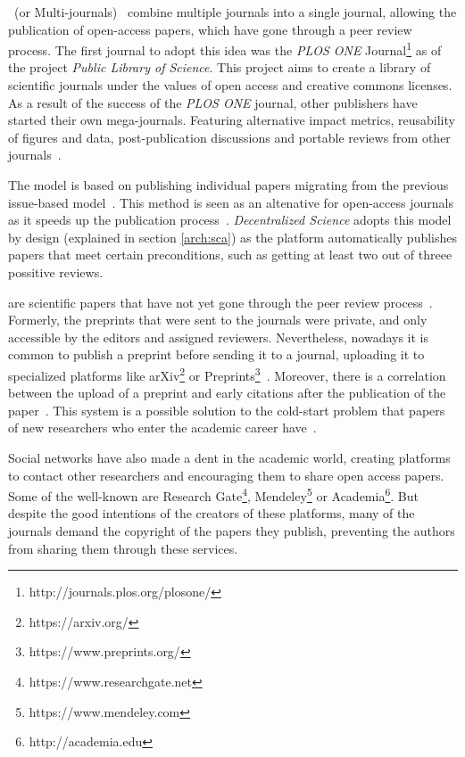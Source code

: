 ~(or Multi-journals)~\cite{binfield2013open,wellen2013open}
combine multiple journals into a single journal, allowing the publication of
open-access papers, which have gone through a peer review process. The first
journal to adopt this idea was the \emph{PLOS ONE}
Journal\footnote{http://journals.plos.org/plosone/} as of the project
\emph{Public Library of Science}. This project aims to create a library of
scientific journals under the values of open access and creative commons
licenses. As a result of the success of the \emph{PLOS ONE} journal, other
publishers have started their own mega-journals. Featuring alternative impact
metrics, reusability of figures and data, post-publication discussions and
portable reviews from other journals~\cite{bjork2015have}.

The  model is based on publishing individual papers
migrating from the previous issue-based model~\cite{anderton2013continuous}.
This method is seen as an altenative for open-access journals as it speeds up
the publication process~\cite{haymanview}. \emph{Decentralized Science} adopts
this model by design (explained in section \ref{arch:sca}) as the platform
automatically publishes papers that meet certain preconditions, such as getting
at least two out of threee possitive reviews.

 are scientific papers that have not yet gone through the peer
review process~\cite{harnad2003electronic}. Formerly, the preprints that were
sent to the journals were private, and only accessible by the editors and
assigned reviewers. Nevertheless, nowadays it is common to publish a preprint
before sending it to a journal, uploading it to specialized platforms like
arXiv\footnote{https://arxiv.org/} or
Preprints\footnote{https://www.preprints.org/}~\cite{brown2001volution}.
Moreover, there is a correlation between the upload of a preprint and early
citations after the publication of the paper~\cite{shuai2012scientific}. This
system is a possible solution to the cold-start problem that papers of new
researchers who enter the academic career have~\cite{sugiyama2010scholarly}.

Social networks have also made a dent in the academic world, creating platforms
to contact other researchers and encouraging them to share open access papers.
 Some of the well-known are Research
Gate\footnote{https://www.researchgate.net},
Mendeley\footnote{https://www.mendeley.com} or
Academia\footnote{http://academia.edu}. But despite the good intentions of the
creators of these platforms, many of the journals demand the copyright of the
papers they publish, preventing the authors from sharing them through these
services.

